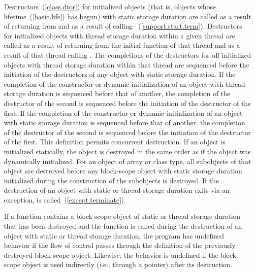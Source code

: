 \pnum
{}%
%
%
Destructors~(\ref{class.dtor}) for initialized objects
(that is, objects whose lifetime~(\ref{basic.life}) has begun)
with static storage duration
are called as a result of returning from  and as a result of calling
%
%
~(\ref{support.start.term}).
Destructors for initialized objects with thread storage duration within a given thread
are called as a result of returning from the initial function of that thread and as a
result of that thread calling .
The completions of the destructors for all initialized objects with thread storage
duration within that thread are sequenced before the initiation of the destructors of
any object with static storage duration.
If the completion of the constructor or dynamic initialization of an object with thread
storage duration is sequenced before that of another, the completion of the destructor
of the second is sequenced before the initiation of the destructor of the first.
If the completion of the constructor or dynamic initialization of an object with static
storage duration is sequenced before that of another, the completion of the destructor
of the second is sequenced before the initiation of the destructor of the first.
\enternote This definition permits concurrent destruction. \exitnote If an object is
initialized statically, the object is destroyed in the same order as if
the object was dynamically initialized. For an object of array or class
type, all subobjects of that object are destroyed before any block-scope
object with static storage duration initialized during the construction
of the subobjects is destroyed.
If the destruction of an object with static or thread storage duration
exits via an exception,
 is called~(\ref{except.terminate}).

\pnum
If a function contains a block-scope object of static or thread storage duration that has been
destroyed and the function is called during the destruction of an object with static or
thread storage duration, the program has undefined behavior if the flow of control
passes through the definition of the previously destroyed block-scope object. Likewise, the
behavior is undefined if the block-scope object is used indirectly (i.e., through a
pointer) after its destruction.

